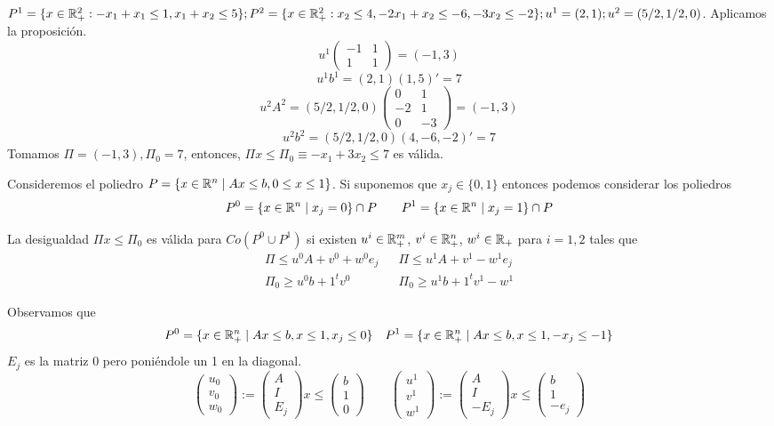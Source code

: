 \documentclass[MIOP.tex]{subfiles}
\begin{document}
\begin{ej}
$P^1=\{x\in\mathbb{R}^2_+:-x_1+x_1\leq 1, x_1+x_2\leq 5\}; P^2=\{x\in\mathbb{R}^2_+:x_2\leq 4,-2x_1+x_2\leq -6, -3x_2\leq -2\}; u^1=(2,1);u^2=(5/2,1/2,0)$. Aplicamos la  proposición. 
$$
u^1\begin{pmatrix}
-1 & 1\\
1 & 1
\end{pmatrix}=(-1,3)
$$
$$u^1b^1=(2,1)(1,5)'=7$$
$$u^2A^2=(5/2,1/2,0)\begin{pmatrix}
0 & 1\\
-2 & 1\\
0 & -3
\end{pmatrix}=(-1,3)$$
$$
u^2b^2=(5/2, 1/2,0)(4, -6,-2)'=7$$
Tomamos $\Pi=(-1,3), \Pi_0=7$, entonces, $\Pi x\leq\Pi_0\equiv -x_1+3x_2\leq 7$ es válida.
\end{ej}
Consideremos el poliedro $P=\{x\in\mathbb{R}^n \mid Ax\leq b, 0\leq x \leq 1\}$. Si suponemos que $x_j\in\{0,1\}$ entonces podemos considerar los poliedros 
$$P^0=\{x\in\mathbb{R}^n \mid x_j =0\}\cap P \qquad P^1 =\{x\in\mathbb{R}^n \mid x_j=1\}\cap P
$$
\begin{prop}
La desigualdad $\Pi x\leq \Pi_0$ es válida para $Co(P^0 \cup P^1)$ si existen $u^i \in \mathbb{R}^m_+$, $v^i \in \mathbb{R}^n_+$, $w^i\in\mathbb{R}_+$ para $i=1,2$ tales que 
\begin{align*}
\Pi\leq u^0A + v^0 + w^0e_j && \Pi \leq u^1 A + v^1-w^1 e_j\\
\Pi_0 \geq u^0b+1^tv^0 && \Pi_0\geq u^1 b +1^t v^1 -w^1
\end{align*}
\end{prop}
\begin{dem}
Observamos que
$$
P^0=\{x\in\mathbb{R}^n_+\mid Ax \leq b, x\leq 1, x_j \leq 0\} \quad P^1=\{x\in\mathbb{R}^n_+\mid Ax \leq b, x\leq 1, -x_j \leq -1\}
$$
$E_j$ es la matriz 0 pero poniéndole un 1 en la diagonal.
$$
\begin{pmatrix}
u_0\\
v_0\\
w_0
\end{pmatrix}:=\begin{pmatrix}
A\\
I\\
E_j
\end{pmatrix}x \leq 
\begin{pmatrix}
b\\
1\\
0
\end{pmatrix}
\qquad
\begin{pmatrix}
u^1\\
v^1\\
w^1
\end{pmatrix} :=
\begin{pmatrix}
A\\
I\\
-E_j
\end{pmatrix}x \leq 
\begin{pmatrix}
b\\
1\\
-e_j
\end{pmatrix}
$$
\end{dem}
\end{document}
